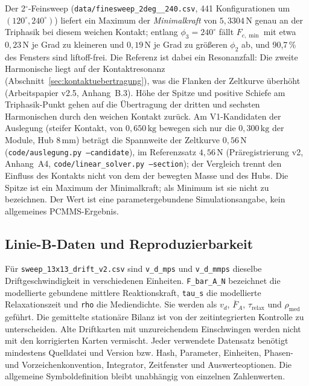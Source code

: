 \documentclass[11pt,a4paper]{article}
\begin{document}
Der 2$^\circ$-Feinsweep (\texttt{data/\allowbreak finesweep\_\allowbreak 2deg\_\_\allowbreak 240.csv}, 441 Konfigurationen um $(120^\circ,240^\circ)$) liefert ein Maximum der \emph{Minimalkraft} von $5{,}3304\,\mathrm N$ genau an der Triphasik bei diesem weichen Kontakt; entlang $\phi_3=240^\circ$ fällt $F_{c,\min}$ mit etwa $0{,}23\,\mathrm N$ je Grad zu kleineren und $0{,}19\,\mathrm N$ je Grad zu größeren $\phi_2$ ab, und 90{,}7\,\% des Fensters sind liftoff-frei. Die Referenz ist dabei ein Resonanzfall: Die zweite Harmonische liegt auf der Kontaktresonanz (Abschnitt~\ref{sec:kontaktuebertragung}), was die Flanken der Zeltkurve überhöht (Arbeitspapier v2.5, Anhang~B.3). Höhe der Spitze und positive Schiefe am Triphasik-Punkt gehen auf die Übertragung der dritten und sechsten Harmonischen durch den weichen Kontakt zurück. Am V1-Kandidaten der Auslegung (steifer Kontakt, von $0{,}650\,\mathrm{kg}$ bewegen sich nur die $0{,}300\,\mathrm{kg}$ der Module, Hub $8\,\mathrm{mm}$) beträgt die Spannweite der Zeltkurve $0{,}56\,\mathrm N$ (\texttt{code/auslegung.py --candidate}), im Referenzsatz $4{,}56\,\mathrm N$ (Präregistrierung v2, Anhang~A4, \texttt{code/linear\_solver.py --section}); der Vergleich trennt den Einfluss des Kontakts nicht von dem der bewegten Masse und des Hubs. Die Spitze ist ein Maximum der Minimalkraft; als Minimum ist sie nicht zu bezeichnen. Der Wert ist eine parametergebundene Simulationsangabe, kein allgemeines PCMMS-Ergebnis.

\subsection{Linie-B-Daten und Reproduzierbarkeit}\label{app:linieb}
Für \texttt{sweep\_13x13\_drift\_v2.csv} sind \texttt{v\_d\_mps} und \texttt{v\_d\_mmps} dieselbe Driftgeschwindigkeit in verschiedenen Einheiten. \texttt{F\_bar\_A\_N} bezeichnet die modellierte gebundene mittlere Reaktionskraft, \texttt{tau\_s} die modellierte Relaxationszeit und \texttt{rho} die Mediendichte. Sie werden als $v_d$, $\overline F_A$, $\tau_{\mathrm{relax}}$ und $\rho_{\mathrm{med}}$ geführt. Die gemittelte stationäre Bilanz ist von der zeitintegrierten Kontrolle zu unterscheiden. Alte Driftkarten mit unzureichendem Einschwingen werden nicht mit den korrigierten Karten vermischt.
Jeder verwendete Datensatz benötigt mindestens Quelldatei und Version bzw. Hash, Parameter, Einheiten, Phasen- und Vorzeichenkonvention, Integrator, Zeitfenster und Auswerteoptionen. Die allgemeine Symboldefinition bleibt unabhängig von einzelnen Zahlenwerten.
\end{document}
